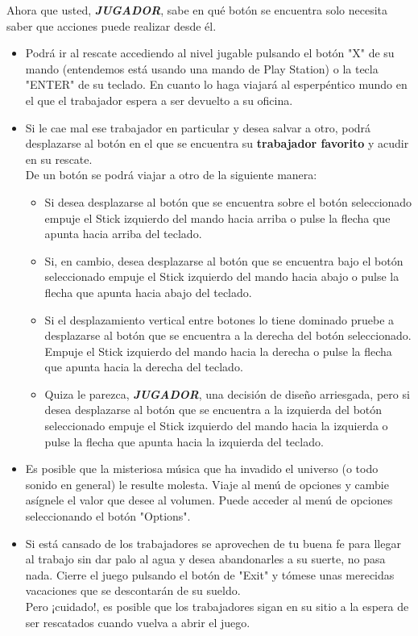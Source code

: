 Ahora que usted,  \textit{\textbf{JUGADOR}}, sabe en qué botón se encuentra solo necesita saber que acciones puede realizar desde él.
\begin{itemize}
\item
Podrá ir al rescate accediendo al nivel jugable pulsando el botón "X" de su mando (entendemos está usando una mando de Play Station) o la tecla "ENTER" de su teclado. En cuanto lo haga viajará al \textcolor{endeavour}{esperpéntico mundo} en el que el \textcolor{azulWorker}{trabajador} espera a ser devuelto a su oficina.
\item
Si le cae mal ese \textcolor{azulWorker}{trabajador} en particular y desea salvar a otro, podrá desplazarse al botón en el que se encuentra su \textcolor{azulWorker}{\textbf{trabajador favorito}} y acudir en su rescate.\\
De un botón se podrá viajar a otro de la siguiente manera:
\begin{itemize}
\item
Si desea desplazarse al botón que se encuentra sobre el botón seleccionado empuje el Stick izquierdo del mando hacia arriba o pulse la flecha que apunta hacia arriba del teclado.
\item
Si, en cambio, desea desplazarse al botón que se encuentra bajo el botón seleccionado empuje el Stick izquierdo del mando hacia abajo o pulse la flecha que apunta hacia abajo del teclado.
\item
Si el desplazamiento vertical entre botones lo tiene dominado pruebe a  desplazarse al botón que se encuentra a la derecha del botón seleccionado. Empuje el Stick izquierdo del mando hacia la derecha o pulse la flecha que apunta hacia la derecha del teclado.
\item
Quiza le parezca, \textit{\textbf{JUGADOR}}, una decisión de diseño arriesgada, pero si desea desplazarse al botón que se encuentra a la izquierda del botón seleccionado empuje el Stick izquierdo del mando hacia la izquierda o pulse la flecha que apunta hacia la izquierda del teclado.
\end{itemize}
\item
Es posible que la misteriosa música que ha invadido el universo (o todo sonido en general) le resulte molesta. Viaje al menú de opciones y cambie asígnele el valor que desee al volumen. Puede acceder al menú de opciones seleccionando el botón "Options".
\item
Si está cansado de los \textcolor{azulWorker}{trabajadores} se aprovechen de tu buena fe para llegar al trabajo sin dar palo al agua y desea abandonarles a su suerte, no pasa nada. Cierre el juego pulsando el botón de "Exit" y tómese unas merecidas vacaciones que se descontarán de su sueldo.\\
Pero ¡cuidado!, es posible que los \textcolor{azulWorker}{trabajadores} sigan en su sitio a la espera de ser rescatados cuando vuelva a abrir el juego.
\end{itemize}


